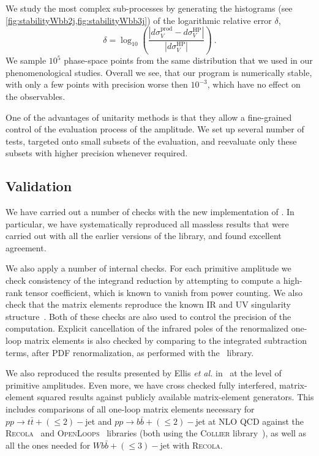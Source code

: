 We study the most complex sub-processes
by generating the histograms (see \cref{fig:stabilityWbb2j,fig:stabilityWbb3j}) of the logarithmic relative error $\delta$,
\begin{equation}
  \delta = \log_{10}\left(\frac{\left|d\sigma^{\text{prod}}_V - d\sigma^{\text{HP}}_V\right|}{\left|d\sigma^{\text{HP}}_V\right|}\right)\ .
  \label{reldiff}
\end{equation}
We sample $10^5$ phase-space points from the same distribution that we used in our phenomenological studies.
Overall we see, that our program is numerically stable,
with only a few points with precision worse then $10^{-3}$,
which have no effect on the observables.

One of the advantages of unitarity methods is that they allow a fine-grained control of the evaluation process
of the amplitude. 
We set up several number of tests, targeted onto small subsets of the evaluation,
and reevaluate only these subsets with higher precision whenever required.


\subsection{Validation}
We have carried out a number of checks with the new implementation of \BlackHat{}.
In particular, we have systematically reproduced all massless results
that were carried out with all the earlier versions of the library, and found
excellent agreement.

We also apply a number of internal checks. For each primitive amplitude we
check consistency of the integrand reduction by attempting to compute a
high-rank tensor coefficient, which is known to vanish from power counting. We
also check that the matrix elements reproduce the known IR and UV singularity structure~\cite{Catani:2000ef}. Both
of these checks are also used to control the precision of the computation.
Explicit cancellation of the infrared poles of the renormalized one-loop matrix
elements is also checked by comparing to the integrated subtraction terms, after
PDF renormalization, as performed with the~\SHERPA{} library.

We also reproduced the results presented by Ellis \textit{et al.}
in~\cite{Ellis:2008ir} at the level of primitive amplitudes. Even more, we have
cross checked fully interfered, matrix-element squared results against
publicly available matrix-element generators. This includes comparisons of all
one-loop matrix elements necessary for $pp\rightarrow t\bar t+(\leq 2)-$jet and
$pp\rightarrow b\bar b+(\leq 2)-$jet at NLO QCD against the
\textsc{Recola}~\cite{Actis:2016mpe} and
\textsc{OpenLoops}~\cite{Cascioli:2011va} libraries (both using the
\textsc{Collier} library~\cite{Denner:2016kdg}), as well as all the ones needed
for $Wb\bar b+(\leq3)-$jet with \textsc{Recola}.

